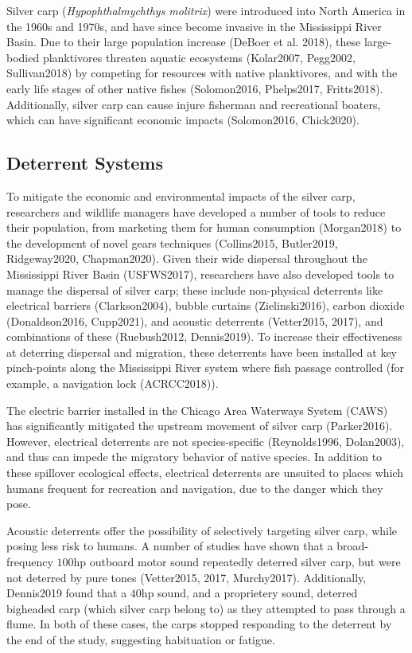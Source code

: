 \documentclass[12pt]{article}
\begin{document}
	Silver carp (\emph{Hypophthalmychthys molitrix}) were introduced into North America in the 1960s and 1970s, and have since become invasive in the Mississippi River Basin. Due to their large population increase (DeBoer et al. 2018), these large-bodied planktivores threaten aquatic ecosystems (Kolar2007, Pegg2002, Sullivan2018) by competing for resources with native planktivores, and with the early life stages of other native fishes (Solomon2016, Phelps2017, Fritts2018).  Additionally, silver carp can cause injure fisherman and recreational boaters, which can have significant economic impacts (Solomon2016, Chick2020).

	\subsection{Deterrent Systems}

	To mitigate the economic and environmental impacts of the silver carp, researchers and wildlife managers have developed a number of tools to reduce their population, from marketing them for human consumption (Morgan2018) to the development of novel gears techniques (Collins2015, Butler2019, Ridgeway2020, Chapman2020). Given their wide dispersal throughout the Mississippi River Basin (USFWS2017), researchers have also developed tools to manage the dispersal of silver carp; these include non-physical deterrents like electrical barriers (Clarkson2004), bubble curtains (Zielinski2016), carbon dioxide (Donaldson2016, Cupp2021), and acoustic deterrents (Vetter2015, 2017), and combinations of these (Ruebush2012, Dennis2019). To increase their effectiveness at deterring dispersal and migration, these deterrents have been installed at key pinch-points along the Mississippi River system  where fish passage controlled (for example, a navigation lock (ACRCC2018)).
	
	The electric barrier installed in the Chicago Area Waterways System (CAWS) has significantly mitigated the upstream movement of silver carp (Parker2016). However, electrical deterrents are not species-specific (Reynolds1996, Dolan2003), and thus can impede the migratory behavior of native species. In addition to these spillover ecological effects, electrical deterrents are unsuited to places which humans frequent for recreation and navigation, due to the danger which they pose.
	
	Acoustic deterrents offer the possibility of selectively targeting silver carp, while posing less risk to humans. A number of studies have shown that a broad-frequency $100$hp outboard motor sound repeatedly deterred silver carp, but were not deterred by pure tones (Vetter2015, 2017, Murchy2017). Additionally, Dennis2019 found that a $40$hp sound, and a proprietery sound, deterred bigheaded carp (which silver carp belong to) as they attempted to pass through a flume. In both of these cases, the carps stopped responding to the deterrent by the end of the study, suggesting habituation or fatigue.
	
\end{document}
